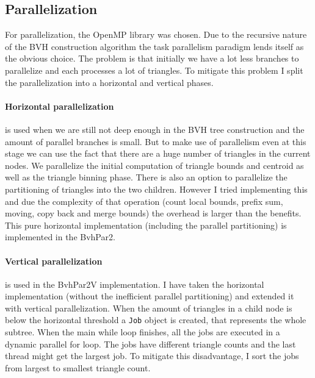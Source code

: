 \documentclass[10pt,a4paper,twocolumn]{article}
\begin{document}
\subsection{Parallelization}
For parallelization, the OpenMP library was chosen. Due to the recursive nature of the BVH construction algorithm the task parallelism paradigm lends itself as the obvious choice. The problem is that initially we have a lot less branches to parallelize and each processes a lot of triangles. To mitigate this problem I split the parallelization into a horizontal and vertical phases.

\paragraph{Horizontal parallelization} is used when we are still not deep enough in the BVH tree construction and the amount of parallel branches is small. But to make use of parallelism even at this stage we can use the fact that there are a huge number of triangles in the current nodes. We parallelize the initial computation of triangle bounds and centroid as well as the triangle binning phase. There is also an option to parallelize the partitioning of triangles into the two children. However I tried implementing this and due the complexity of that operation (count local bounds, prefix sum, moving, copy back and merge bounds) the overhead is larger than the benefits. This pure horizontal implementation (including the parallel partitioning) is implemented in the BvhPar2.

\paragraph{Vertical parallelization} is used in the BvhPar2V implementation. I have taken the horizontal implementation (without the inefficient parallel partitioning) and extended it with vertical parallelization. When the amount of triangles in a child node is below the horizontal threshold a \texttt{Job} object is created, that represents the whole subtree. When the main while loop finishes, all the jobs are executed in a dynamic parallel for loop. The jobs have different triangle counts and the last thread might get the largest job. To mitigate this disadvantage, I sort the jobs from largest to smallest triangle count.
\end{document}
